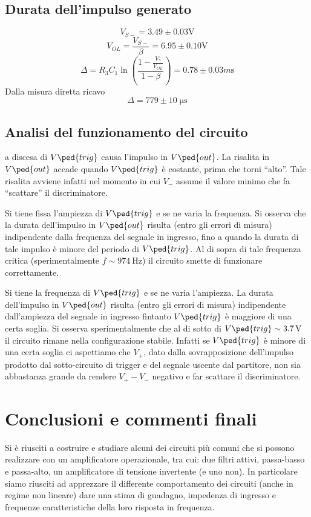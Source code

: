 \documentclass[10pt,a4paper]{article}
\begin{document}
\subsection{Durata dell'impulso generato}
\[
V_{S-}= 3.49 \pm 0.03 \si{\V}
\]
\[
V_{OL} = \frac{V_{S-}}{\beta} = 6.95 \pm 0.10 \si{\V}
\]
\[
\Delta= R_3 C_1 \ln(\frac{1 - \frac{V_\gamma}{V_{OL}}}{1 - \beta})= 0.78 \pm 0.03 \si{m\s}
\]
Dalla misura diretta ricavo
\[
\Delta= 779 \pm 10 \;\si{\micro\s}
\]

\subsection{Analisi del funzionamento del circuito}
a discesa di $ V\ped{trig} $ causa l'impulso in $ V\ped{out} $. La risalita in $ V\ped{out} $ accade quando $ V\ped{trig} $ è costante, prima che torni ``alto''. Tale risalita avviene infatti nel momento in cui $ V_{-} $ assume il valore minimo che fa ``scattare'' il discriminatore.

Si tiene fissa l'ampiezza di $ V\ped{trig} $ e se ne varia la frequenza. Si osserva che la durata dell'impulso in $ V \ped{out} $ risulta (entro gli errori di misura) indipendente dalla frequenza del segnale in ingresso, fino a quando la durata di tale impulso è minore del periodo di $ V\ped{trig} $. Al di sopra di tale frequenza critica (sperimentalmente $ f \sim \SI{974}{\hertz} $) il circuito smette di funzionare correttamente.

Si tiene la frequenza di $ V\ped{trig} $ e se ne varia l'ampiezza. La durata dell'impulso in $ V\ped{out} $ risulta (entro gli errori di misura) indipendente dall'ampiezza del segnale in ingresso fintanto $ V\ped{trig} $ è maggiore di una certa soglia. Si osserva sperimentalmente che al di sotto di $ V\ped{trig} \sim \SI{3.7}{\volt} $ il circuito rimane nella configurazione stabile. Infatti se $ V\ped{trig} $ è minore di una certa soglia ci aspettiamo che $ V_{+} $, dato dalla sovrapposizione dell'impulso prodotto dal sotto-circuito di trigger e del segnale uscente dal partitore, non sia abbastanza grande da rendere $ V_{+} - V_{-} $ negativo e far scattare il discriminatore.


\section*{Conclusioni e commenti finali}
Si è riusciti a costruire e studiare alcuni dei circuiti più comuni che si
possono realizzare con un amplificatore operazionale, tra cui: due filtri
attivi, passa-basso e passa-alto, un amplificatore di tensione invertente
(e uno non).
In particolare siamo riusciti ad apprezzare il differente comportamento dei
circuiti (anche in regime non lineare) dare una stima di guadagno, impedenza di
ingresso e frequenze caratteristiche della loro risposta in frequenza.
\end{document}
